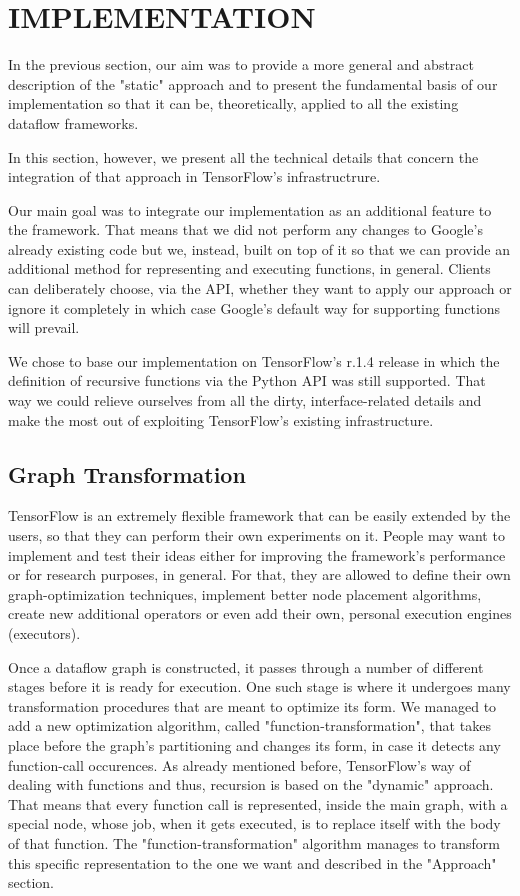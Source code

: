 \documentclass[ack,preface]{dithesis}
\begin{document}
\chapter{IMPLEMENTATION}
In the previous section, our aim was to provide a more general and abstract description of the "static" approach and to present the fundamental basis of our implementation so that it can be, theoretically, applied to all the existing dataflow frameworks. 

In this section, however, we present all the technical details that concern the integration of that approach in TensorFlow's infrastructrure.

Our main goal was to integrate our implementation as an additional feature to the framework. That means that we did not perform any changes to Google's already existing code but we, instead, built on top of it so that we can provide an additional method for representing and executing functions, in general. Clients can deliberately choose, via the API, whether they want to apply our approach or ignore it completely in which case Google's default way for supporting functions will prevail.

We chose to base our implementation on TensorFlow's r.1.4 release in which the definition of recursive functions via the Python API was still supported. That way we could relieve ourselves from all the dirty, interface-related details and make the most out of exploiting TensorFlow's existing infrastructure.  



    \section{Graph Transformation}

TensorFlow is an extremely flexible framework that  can be easily extended by the users, so that they can perform their own experiments on it. People may want to implement and test their  ideas either for improving the framework's performance or for research purposes, in general. For that, they are allowed to define their own graph-optimization techniques, implement better node placement algorithms, create new additional operators or even add their own, personal execution engines (executors).

Once a dataflow graph is constructed, it passes through a number of different stages before it is ready for execution. One such stage is where it undergoes many transformation procedures that are meant to optimize its form. We managed to add a new optimization algorithm, called "function-transformation", that takes place before the graph's partitioning and changes its form, in case it detects any function-call occurences.
As already mentioned before, TensorFlow's  way of dealing with functions and thus, recursion is based on the "dynamic" approach. That means that every function call is represented, inside the main graph, with a special node, whose job, when it gets executed, is to replace itself with the body of that function. The "function-transformation" algorithm  manages to transform this specific representation to the one we want and described in the "Approach" section. 
\end{document}
